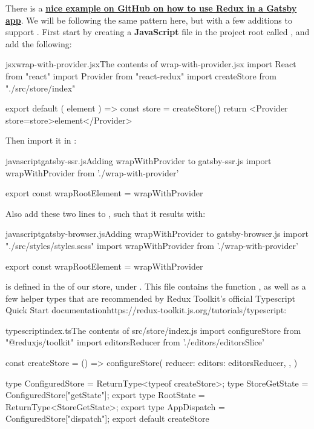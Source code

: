 \documentclass[paper=6in:9in,pagesize=pdftex,headinclude=on,footinclude=on,12pt,twoside]{scrbook}
\newcommand{\link}[2]{\textbf{\textcolor{monokaiPink}{\href{#2}{#1}}}}
\begin{document}

There is a \link{nice example on GitHub on how to use Redux in a Gatsby app}{https://github.com/gatsbyjs/gatsby/tree/master/examples/using-redux}. We will be following the same pattern here, but with a few additions to support . First start by creating a \textbf{JavaScript} file in the project root called , and add the following:

\begin{codeInput}{jsx}{wrap-with-provider.jsx}{The contents of wrap-with-provider.jsx}
import React from "react"
import { Provider } from "react-redux"
import createStore from "./src/store/index"

export default ({ element }) => {
  const store = createStore()
  return <Provider store={store}>{element}</Provider>
}  
\end{codeInput}

Then import it in :

\begin{codeInput}{javascript}{gatsby-ssr.js}{Adding wrapWithProvider to gatsby-ssr.js}
import wrapWithProvider from './wrap-with-provider'

export const wrapRootElement = wrapWithProvider
\end{codeInput}

Also add these two lines to , such that it results with:

\begin{codeInput}{javascript}{gatsby-browser.js}{Adding wrapWithProvider to gatsby-browser.js}
import "./src/styles/styles.scss"
import wrapWithProvider from './wrap-with-provider'

export const wrapRootElement = wrapWithProvider
\end{codeInput}

 is defined in the  of our store, under . This file contains the function , as well as a few helper types that are recommended by {Redux Toolkit's official Typescript Quick Start documentation}{https://redux-toolkit.js.org/tutorials/typescript}:

\begin{codeInput}{typescript}{index.ts}{The contents of src/store/index.js}
import { configureStore } from "@reduxjs/toolkit"
import editorsReducer from './editors/editorsSlice'

const createStore = () => configureStore({
  reducer: {
    editors: editorsReducer,
  },
})

type ConfiguredStore = ReturnType<typeof createStore>;
type StoreGetState = ConfiguredStore["getState"];
export type RootState = ReturnType<StoreGetState>;
export type AppDispatch = ConfiguredStore["dispatch"];
export default createStore
\end{codeInput}
\end{document}
